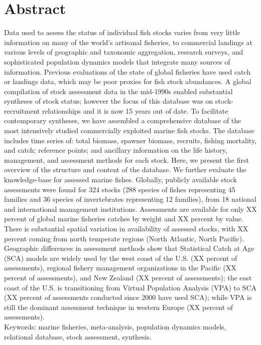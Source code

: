 \newpage
\section*{Abstract}

Data used to assess the status of individual fish stocks varies from
very little information on many of the world's artisanal fisheries, to
commercial landings at various levels of geographic and taxonomic
aggregation, research surveys, and sophisticated population dynamics
models that integrate many sources of information.  Previous
evaluations of the state of global fisheries have used catch or
landings data, which may be poor proxies for fish stock abundances. A
global compilation of stock assessment data in the mid-1990s enabled
substantial syntheses of stock status; however the focus of this
database was on stock-recruitment relationships and it is now 15 years
out of date. To facilitate contemporary syntheses, we have assembled a
comprehensive database of the most intensively studied commercially
exploited marine fish stocks. The database includes time series of:
total biomass, spawner biomass, recruits, fishing mortality, and
catch; reference points; and ancillary information on the life
history, management, and assessment methods for each stock.  Here, we
present the first overview of the structure and content of the
database. We further evaluate the knowledge-base for assessed marine
fishes. Globally, publicly available stock assessments were found for
324 stocks (288 species of
fishes representing 45 families and
36 species of invertebrates representing
12 families), from 18
national and international management institutions. Assessments are
available for only XX percent of global marine fisheries catches by
weight and XX percent by value.  There is substantial spatial
variation in availability of assessed stocks, with XX percent coming
from north temperate regions (North Atlantic, North Pacific).
Geographic differences in assessment methods show that Statistical
Catch at Age (SCA) models are widely used by the west coast of the
U.S. (XX percent of assessments), regional fishery management
organizations in the Pacific (XX percent of assessments), and New
Zealand (XX percent of assessments); the east coast of the U.S. is
transitioning from Virtual Population Analysis (VPA) to SCA (XX
percent of assessments conducted since 2000 have used SCA); while VPA
is still the dominant assessment
technique in western Europe (XX percent of assessments).\\

\noindent Keywords: marine fisheries, meta-analysis, population dynamics models, relational database, stock assessment, synthesis.
\newpage
